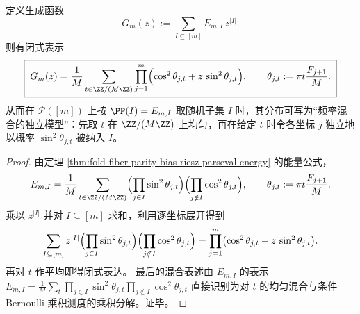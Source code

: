 \begin{proposition}[奇偶能量的生成函数与频率混合的独立模型]\label{prop:fold-fiber-parity-energy-partition-function-mixture}
定义生成函数
\[
G_m(z):=\sum_{I\subseteq[m]}E_{m,I}\,z^{|I|}.
\]
则有闭式表示
\[
\boxed{\;
G_m(z)=\frac1{M}\sum_{t\in\ZZ/(M\ZZ)}
\prod_{j=1}^{m}\Bigl(\cos^2\theta_{j,t}+z\,\sin^2\theta_{j,t}\Bigr),\qquad
\theta_{j,t}:=\pi t\frac{F_{j+1}}{M}.\;}
\]
从而在 \(\mathcal P([m])\) 上按 \(\PP(I)=E_{m,I}\) 取随机子集 \(I\) 时，其分布可写为“频率混合的独立模型”：先取 \(t\) 在 \(\ZZ/(M\ZZ)\) 上均匀，再在给定 \(t\) 时令各坐标 \(j\) 独立地以概率 \(\sin^2\theta_{j,t}\) 被纳入 \(I\)。
\end{proposition}
\begin{proof}
由定理 \ref{thm:fold-fiber-parity-bias-riesz-parseval-energy} 的能量公式，
\[
E_{m,I}=\frac1M\sum_{t\in\ZZ/(M\ZZ)}\Bigl(\prod_{j\in I}\sin^2\theta_{j,t}\Bigr)\Bigl(\prod_{j\notin I}\cos^2\theta_{j,t}\Bigr),
\qquad
\theta_{j,t}:=\pi t\frac{F_{j+1}}{M}.
\]
乘以 \(z^{|I|}\) 并对 \(I\subseteq[m]\) 求和，利用逐坐标展开得到
\[
\sum_{I\subseteq[m]}z^{|I|}\Bigl(\prod_{j\in I}\sin^2\theta_{j,t}\Bigr)\Bigl(\prod_{j\notin I}\cos^2\theta_{j,t}\Bigr)
=\prod_{j=1}^{m}\bigl(\cos^2\theta_{j,t}+z\,\sin^2\theta_{j,t}\bigr).
\]
再对 \(t\) 作平均即得闭式表达。
最后的混合表述由 \(E_{m,I}\) 的表示
\(
E_{m,I}=\frac1M\sum_t \prod_{j\in I}\sin^2\theta_{j,t}\prod_{j\notin I}\cos^2\theta_{j,t}
\)
直接识别为对 \(t\) 的均匀混合与条件 Bernoulli 乘积测度的乘积分解。证毕。
\end{proof}

\endinput

